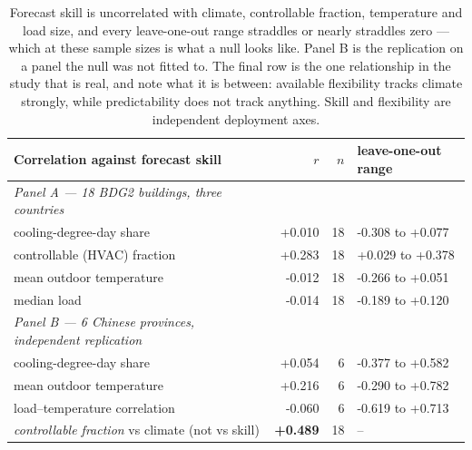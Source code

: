 \begin{table}[t]
\centering
\footnotesize
\setlength{\tabcolsep}{3pt}
\begin{tabular}{lrrl}
\toprule
Correlation against forecast skill & $r$ & $n$ & leave-one-out range \\
\midrule
\emph{Panel A --- 18 BDG2 buildings, three countries} &  &  &  \\
\quad cooling-degree-day share & +0.010 & 18 & -0.308 to +0.077 \\
\quad controllable (HVAC) fraction & +0.283 & 18 & +0.029 to +0.378 \\
\quad mean outdoor temperature & -0.012 & 18 & -0.266 to +0.051 \\
\quad median load & -0.014 & 18 & -0.189 to +0.120 \\
\midrule
\emph{Panel B --- 6 Chinese provinces, independent replication} &  &  &  \\
\quad cooling-degree-day share & +0.054 & 6 & -0.377 to +0.582 \\
\quad mean outdoor temperature & +0.216 & 6 & -0.290 to +0.782 \\
\quad load--temperature correlation & -0.060 & 6 & -0.619 to +0.713 \\
\midrule
\emph{controllable fraction} vs climate (not vs skill) & \textbf{+0.489} & 18 & -- \\
\bottomrule
\end{tabular}
\caption{Forecast skill is uncorrelated with climate, controllable fraction, temperature and load size, and every leave-one-out range straddles or nearly straddles zero --- which at these sample sizes is what a null looks like. Panel B is the replication on a panel the null was not fitted to. The final row is the one relationship in the study that is real, and note what it is between: available flexibility tracks climate strongly, while predictability does not track anything. Skill and flexibility are independent deployment axes.}
\label{tab:correlations}
\end{table}
